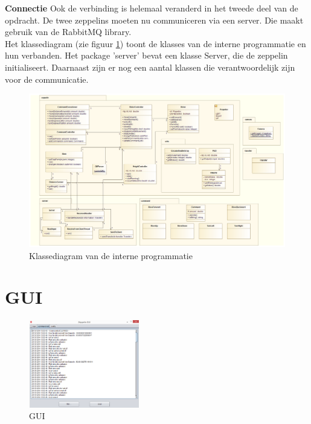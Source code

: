 \documentclass[eind]{penoverslag}
\begin{document}
\textbf{Connectie}
Ook de verbinding is helemaal veranderd in het tweede deel van de opdracht. De twee zeppelins moeten nu communiceren via een server. Die maakt gebruik van de RabbitMQ library. \\

Het klassediagram (zie figuur \ref{UML}) toont de klasses van de interne programmatie en hun verbanden. Het package 'server' bevat een klasse Server, die de zeppelin initialiseert. Daarnaast zijn er nog een aantal klassen die verantwoordelijk zijn voor de communicatie.

\newpage

\begin{figure}[!ht]
\centering
\includegraphics[scale=0.38,angle=90]{UML.png}
\caption{Klassediagram van de interne programmatie}
\label{UML}
\end{figure}

\section{GUI}
\begin{figure}
\centering
\includegraphics[width=0.43\textwidth]{GUI2.png}
\caption{GUI}
\label{GUI}
\end{figure}
\end{document}

